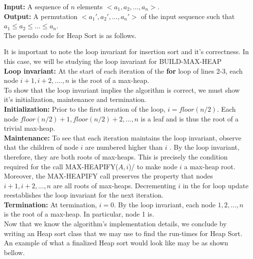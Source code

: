 \documentclass[12pt]{article}
\begin{document}
\textbf{Input:} A sequence of $n$ elements $<a_1, a_2, ..., a_n>$.\\

\textbf{Output:} A permutation $<a_1', a_2', ..., a_n'>$ of the input sequence such that \\
\indent $a_1 \le a_2 \le ... \le a_n$.\\

The pseudo code for Heap Sort is as follows.



It is important to note the loop invariant for insertion sort and it's correctness. In this case, we will be studying the loop invariant for BUILD-MAX-HEAP \\

\textbf{Loop invariant:} At the start of each iteration of the \textbf{for} loop of lines 2-3, each node $i+1, i+2, ....,n$ is the root of a max-heap. \\

To show that the loop invariant implies the algorithm is correct, we must show it's initialization, maintenance and termination.  \\

\textbf{Initialization:} Prior to the first iteration of the loop, $i=floor(n/2)$. Each node $floor(n/2) +1, floor(n/2)+2,...,n$ is a leaf and is thus the root of a trivial max-heap.\\

\textbf{Maintenance:} To see that each iteration maintains the loop invariant, observe that the children of node $i$ are numbered higher than $i$ . By the loop invariant, therefore, they are both roots of max-heaps. This is precisely the condition required for the call MAX-HEAPIFY($A,i$)/ to make node $i$ a max-heap root. Moreover, the MAX-HEAPIFY call preserves the property that nodes $i+1, i+2, ...,n$ are all roots of max-heaps. Decrementing $i$ in the for loop update reestablishes the loop invariant for the next iteration.\\

\textbf{Termination:} At termination, $i=0$. By the loop invariant, each node $1,2,...,n$ is the root of a max-heap. In particular, node 1 is.\\

Now that we know the algorithm's implementation details, we conclude by writing an Heap sort class that we may use to find the run-times for Heap Sort. An example of what a finalized Heap sort would look like may be as shown bellow.\\
\end{document}
